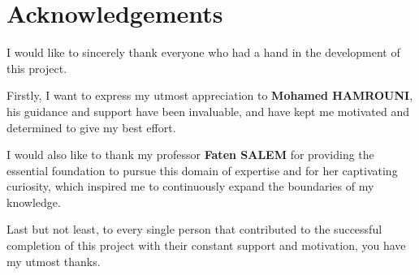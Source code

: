 \chapter*{\huge Acknowledgements}

I would like to sincerely thank everyone who had a hand in the development of this project.

Firstly, I want to express my utmost appreciation to \textbf{Mohamed HAMROUNI}, his guidance and support have been invaluable, and have kept me motivated and determined to give my best effort.

I would also like to thank my professor \textbf{Faten SALEM} for providing the essential foundation to pursue this domain of expertise and for her captivating curiosity, which inspired me to continuously expand the boundaries of my knowledge.

Last but not least, to every single person that contributed to the successful completion of this project with their constant support and motivation, you have my utmost thanks.
